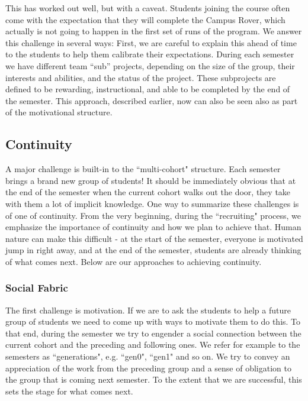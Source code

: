 This has worked out well, but with a caveat. Students joining the course often come with the expectation that they will complete the Campus Rover, which actually is not going to happen in the first set of runs of the program. We answer this challenge in several ways: First, we are careful to explain this ahead of time to the students to help them calibrate their expectations. During each semester we have different team ``sub'' projects, depending on the size of the group, their interests and abilities, and the status of the project. These subprojects are defined to be rewarding, instructional, and able to be completed by the end of the semester. This approach, described earlier, now can also be seen also as part of the motivational structure.

\subsection{Continuity}A major challenge is built-in to the ``multi-cohort" structure. Each semester brings a brand new group of students! It should be immediately obvious that at the end of the semester when the current cohort walks out the door, they take with them a lot of implicit knowledge. One way to summarize these challenges is of one of continuity. From the very beginning, during the ``recruiting" process, we emphasize the importance of continuity and how we plan to achieve that. Human nature can make this difficult - at the start of the semester, everyone is motivated jump in right away, and at the end of the semester, students are already thinking of what comes next. Below are our approaches to achieving continuity.

\subsubsection{Social Fabric}The first challenge is motivation. If we are to ask the students to help a future group of students we need to come up with ways to motivate them to do this. To that end, during the semester we try to engender a social connection between the current cohort and the preceding and following ones. We refer for example to the semesters as ``generations", e.g. ``gen0", ``gen1" and so on. We try to convey an appreciation of the work from the preceding group and a sense of obligation to the group that is coming next semester. To the extent that we are successful, this sets the stage for what comes next. 

